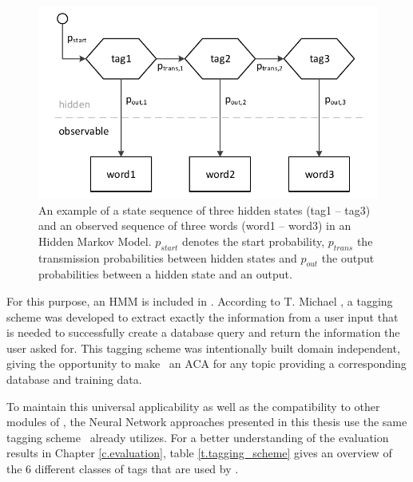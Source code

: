 \begin{figure}[H]
	\includegraphics[width=\textwidth]{images/hmm_structure}
	\caption[Structure of a Hidden Markov Model]{An example of a state sequence of three hidden states (tag1 -- tag3) and an observed sequence of three words (word1 -- word3) in an Hidden Markov Model. $p_{start}$ denotes the start probability, $p_{trans}$ the transmission probabilities between hidden states and $p_{out}$ the output probabilities between a hidden state and an output.}
	\label{f.hmm_structure}
\end{figure}

For this purpose, an HMM is included in \Alex. According to T. Michael \cite{michael2016}, a tagging scheme was developed to extract exactly the information from a user input that is needed to successfully create a database query and return the information the user asked for. This tagging scheme was intentionally built domain independent, giving the opportunity to make \Alex\ an ACA for any topic providing a corresponding database and training data.

To maintain this universal applicability as well as the compatibility to other modules of \Alex, the Neural Network approaches presented in this thesis use the same tagging scheme \Alex\ already utilizes. For a better understanding of the evaluation results in Chapter \ref{c.evaluation}, table \ref{t.tagging_scheme} gives an overview of the 6 different classes of tags that are used by \Alex.

